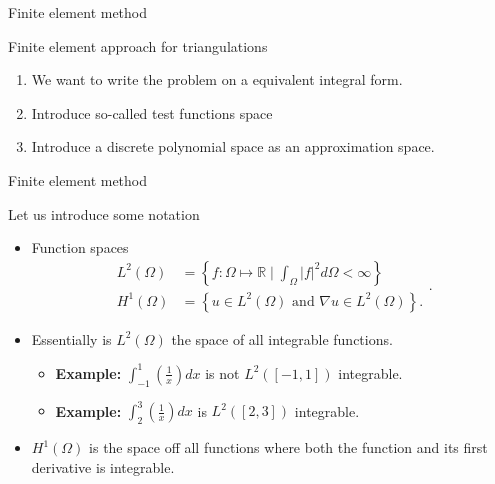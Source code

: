 \begin{frame}{Finite element method}
        \begin{block}{Finite element approach for triangulations}
            \begin{enumerate}
                \item We want to write the problem on a equivalent integral form.
                \item Introduce so-called test functions space
                \item Introduce a discrete polynomial space as an approximation space.
            \end{enumerate}
        \end{block}
\end{frame}

\begin{frame}{Finite element method}

        \begin{block}{Let us introduce some notation}
            \begin{itemize}
                \item
                 Function spaces
                    \begin{equation*}
                        \begin{split}
                        L^{2}( \Omega  ) & = \left\{ f: \Omega \mapsto \mathbb{R}  \mid \int_{\Omega }^{} \left\lvert f \right\rvert ^{2} d \Omega  < \infty  \right\} \\
                        H^{1}( \Omega  ) & = \left\{ u \in L^{2}\left( \Omega  \right)  \text{ and }  \nabla  u \in L^{2}\left( \Omega  \right)   \right\}.
                        \end{split}
                    .\end{equation*}

                \item Essentially is $L^2( \Omega ) $ the space of all integrable functions.
                    \begin{itemize}
                        \item \textbf{Example:} $ \int_{-1}^{1} (\frac{1}{x}) dx  $ is not $L^2(\left[ -1,1 \right] )$  integrable. \\
                        \item \textbf{Example:} $ \int_{2}^{3} (\frac{1}{x}) dx  $ is $L^2(\left[ 2,3 \right] )$  integrable. \\
                    \end{itemize}


                \item $H^{1}( \Omega )$ is the space off all functions where both the function and its first derivative is integrable.
            \end{itemize}

        \end{block}
\end{frame}



